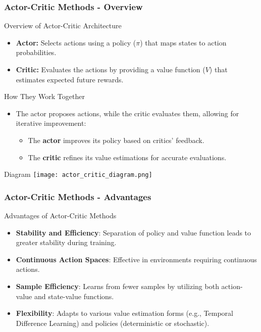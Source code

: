 \documentclass[aspectratio=169]{beamer}
\begin{document}
\begin{frame}[fragile]
    \frametitle{Actor-Critic Methods - Overview}
    \begin{block}{Overview of Actor-Critic Architecture}
        \begin{itemize}
            \item \textbf{Actor:} Selects actions using a policy ($\pi$) that maps states to action probabilities.
            \item \textbf{Critic:} Evaluates the actions by providing a value function ($V$) that estimates expected future rewards.
        \end{itemize}
    \end{block}
    
    \begin{block}{How They Work Together}
        \begin{itemize}
            \item The actor proposes actions, while the critic evaluates them, allowing for iterative improvement:
                \begin{itemize}
                    \item The \textbf{actor} improves its policy based on critics' feedback.
                    \item The \textbf{critic} refines its value estimations for accurate evaluations.
                \end{itemize}
        \end{itemize}
    \end{block}
    
    \begin{block}{Diagram}
        \texttt{[image: actor\_critic\_diagram.png]} %
    \end{block}
\end{frame}

\begin{frame}[fragile]
    \frametitle{Actor-Critic Methods - Advantages}
    \begin{block}{Advantages of Actor-Critic Methods}
        \begin{itemize}
            \item \textbf{Stability and Efficiency}: Separation of policy and value function leads to greater stability during training.
            \item \textbf{Continuous Action Spaces}: Effective in environments requiring continuous actions.
            \item \textbf{Sample Efficiency}: Learns from fewer samples by utilizing both action-value and state-value functions.
            \item \textbf{Flexibility}: Adapts to various value estimation forms (e.g., Temporal Difference Learning) and policies (deterministic or stochastic).
        \end{itemize}
    \end{block}
\end{frame}
\end{document}
